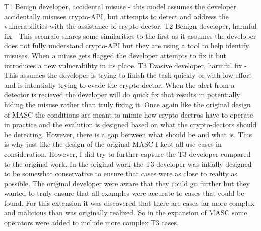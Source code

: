 T1 Benign developer, accidental misuse - this model assumes the developer accidentally misuses crypto-API, but attempts to detect and address the vulnerabilities with the assistance of crypto-dector.
T2 Benign developer, harmful fix - This scenraio shares some similarities to the first as it assumes the developer does not fully understand crypto-API but they are using a tool to help identify misuses. When a miuse gets flagged the developer attempts to fix it but introduces a new vulnerability in its place.
T3 Evasive developer, harmful fix - This assumes the developer is trying to finish the task quickly or with low effort and is intentially trying to evade the crypto-dector. When the alert from a detector is recieved the developer will do quick fix that results in potentially hiding the misuse rather than truly fixing it.
Once again like the original design of MASC the conditions are meant to mimic how crypto-dectros have to operate in practice and the evalution is designed based on what the crypto-dectors should be detecting. However, there is a gap between what should be and what is. This is why just like the design of the original MASC I kept all use cases in consideration. 
However, I did try to further capture the T3 developer compared to the original work. In the original work the T3 developer was intially designed to be somewhat conservative to ensure that cases were as close to reality as possible. The original developer were aware that they could go further but they wanted to truly ensure that all examples were accurate to cases that could be found. For this extension it was discovered that there are cases far more complex and malicious than was originally realized. So in the expansion of MASC some operators were added to include more complex T3 cases.
